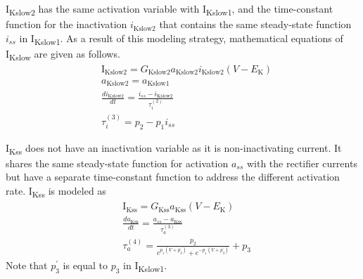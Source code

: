 \documentclass[11pt]{article}
\begin{document}
I\textsubscript{Kslow2} has the same activation variable with I\textsubscript{Kslow1}, and the time-constant function for the inactivation $i_{\mathrm{Kslow2}}$ that contains the same steady-state function $i_{ss}$ in I\textsubscript{Kslow1}. As a result of this modeling strategy, mathematical equations of I\textsubscript{Kslow} are given as follows. 
\begin{align}
    &\mathrm{I}_{\mathrm{Kslow2}} = G_{\mathrm{Kslow2}}a_{\mathrm{Kslow2}}i_{\mathrm{Kslow2}}(V-E_{\mathrm{K}}) \\
    &a_{\mathrm{Kslow2}} = a_{\mathrm{Kslow1}} \\
    &\frac{di_{\mathrm{Kslow2}}}{dt} = \frac{i_{ss}-i_{\mathrm{Kslow2}}}{\tau_{i}^{(2)}} \\
    &\tau_{i}^{(3)} = p_{2} - p_{1}i_{ss}
\end{align}

I\textsubscript{Kss} does not have an inactivation variable as it is non-inactivating current. It shares the same steady-state function for activation $a_{ss}$ with the rectifier currents but have a separate time-constant function to address the different activation rate. I\textsubscript{Kss} is modeled as
\begin{align}
    &\mathrm{I}_{\mathrm{Kss}} = G_{\mathrm{Kss}}a_{\mathrm{Kss}}(V-E_{\mathrm{K}}) \\
    &\frac{da_{\mathrm{Kss}}}{dt} = \frac{a_{ss}-a_{\mathrm{Kss}}}{\tau_{a}^{(3)}} \\
    &\tau_{a}^{(4)}= \frac{p_{2}}{e^{p_{1}(V+p_{3}^\prime)}+e^{-p_{1}(V+p_{3}^\prime)}} + p_{3}
\end{align}
Note that $p_{3}^\prime$ is equal to $p_{3}$ in I\textsubscript{Kslow1}.
\end{document}
